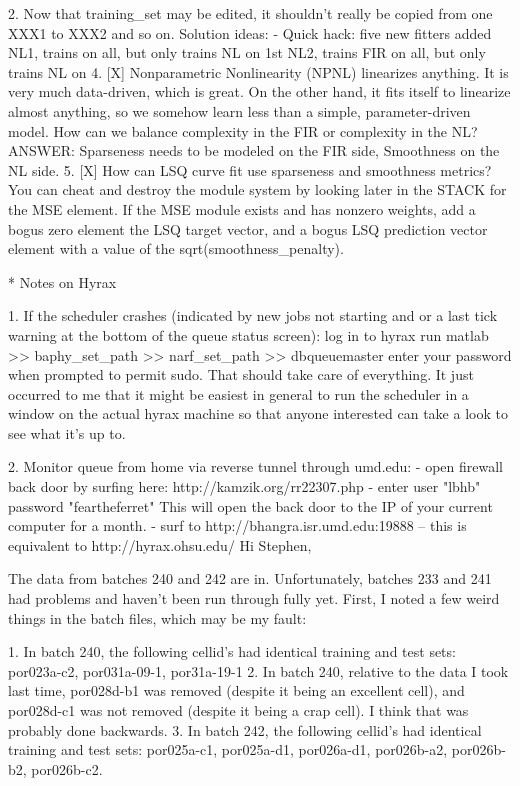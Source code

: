 	 2. Now that training_set{} may be edited, it shouldn't really be copied from one XXX{1} to XXX{2} and so on.
	 Solution ideas: 
	 - Quick hack: five new fitters added
	   NL1, trains on all, but only trains NL on 1st
	   NL2, trains FIR on all, but only trains NL on 
  4. [X] Nonparametric Nonlinearity (NPNL) linearizes anything. 
	 It is very much data-driven, which is great. 
	 On the other hand, it fits itself to linearize almost anything, so we somehow learn less than a simple, parameter-driven model. 
	 How can we balance complexity in the FIR or complexity in the NL?
	 ANSWER: Sparseness needs to be modeled on the FIR side, Smoothness on the NL side. 
  5. [X] How can LSQ curve fit use sparseness and smoothness metrics?
	 You can cheat and destroy the module system by looking later in the STACK for the MSE element. 
	 If the MSE module exists and has nonzero weights, add a bogus zero element the LSQ target vector, and a bogus LSQ prediction vector element with a value of the sqrt(smoothness_penalty).	  

* Notes on Hyrax

1. If the scheduler crashes (indicated by new jobs not starting and or a last tick warning at the bottom of the queue status screen):
  log in to hyrax
  run matlab
  >> baphy_set_path
  >> narf_set_path    %
  >> dbqueuemaster
  enter your password when prompted to permit sudo. 
That should take care of everything.   It just occurred to me that it might be easiest in general to run the scheduler in a window on the actual hyrax machine so that anyone interested can take a look to see what it's up to.

2. Monitor queue from home via reverse tunnel through umd.edu:
  - open firewall back door by surfing here:  http://kamzik.org/rr22307.php
  - enter user "lbhb" password "feartheferret"  This will open the back door to the IP of your current computer for a month.
  - surf to http://bhangra.isr.umd.edu:19888   -- this is equivalent to http://hyrax.ohsu.edu/
Hi Stephen,

The data from batches 240 and 242 are in. Unfortunately, batches 233 and 241 had problems and haven't been run through fully yet. First, I noted a few weird things in the batch files, which may be my fault:

1. In batch 240, the following cellid's had identical training and test sets: por023a-c2, por031a-09-1, por31a-19-1
2. In batch 240, relative to the data I took last time, por028d-b1 was removed (despite it being an excellent cell), and por028d-c1 was not removed (despite it being a crap cell). I think that was probably done backwards.
3. In batch 242, the following cellid's had identical training and test sets: por025a-c1, por025a-d1, por026a-d1, por026b-a2, por026b-b2, por026b-c2.

